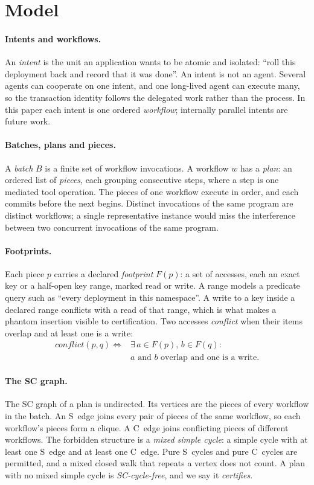 \section{Model}
\label{sec:model}

\paragraph{Intents and workflows.}
An \emph{intent} is the unit an application wants to be atomic and isolated:
``roll this deployment back and record that it was done''. An intent is not an
agent. Several agents can cooperate on one intent, and one long-lived agent
can execute many, so the transaction identity follows the delegated work
rather than the process. In this paper each intent is one ordered
\emph{workflow}; internally parallel intents are future work.

\paragraph{Batches, plans and pieces.}
A \emph{batch} $B$ is a finite set of workflow invocations. A workflow $w$ has
a \emph{plan}: an ordered list of \emph{pieces}, each grouping consecutive
steps, where a step is one mediated tool operation. The pieces of one
workflow execute in order, and each commits before the next begins. Distinct
invocations of the same program are distinct workflows; a single
representative instance would miss the interference between two concurrent
invocations of the same program.

\paragraph{Footprints.}
Each piece $p$ carries a declared \emph{footprint} $F(p)$: a set of accesses,
each an exact key or a half-open key range, marked read or write. A range
models a predicate query such as ``every deployment in this namespace''. A
write to a key inside a declared range conflicts with a read of that range,
which is what makes a phantom insertion visible to certification. Two
accesses \emph{conflict} when their items overlap and at least one is a write:
\begin{align*}
\mathit{conflict}(p,q) \iff{} & \exists\, a\in F(p),\, b\in F(q):\\
 & a \text{ and } b \text{ overlap and one is a write.}
\end{align*}

\paragraph{The SC graph.}
The SC graph of a plan is undirected. Its vertices are the pieces of every
workflow in the batch. An S~edge joins every pair of pieces of the same
workflow, so each workflow's pieces form a clique. A C~edge joins conflicting
pieces of different workflows. The forbidden structure is a \emph{mixed simple
cycle}: a simple cycle with at least one S~edge and at least one C~edge. Pure
S~cycles and pure C~cycles are permitted, and a mixed closed walk that repeats
a vertex does not count. A plan with no mixed simple cycle is
\emph{SC-cycle-free}, and we say it \emph{certifies}.

